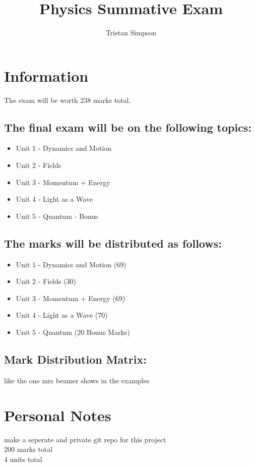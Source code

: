 \documentclass{article}
\title{Physics Summative Exam}
\author{Tristan Simpson}
\begin{document}
\maketitle
\tableofcontents
\doublespacing

\section{Information}
The exam will be worth 238 marks total.
\subsection*{The final exam will be on the following topics:}
\begin{itemize}
    \item Unit 1 - Dynamics and Motion
    \item Unit 2 - Fields
    \item Unit 3 - Momentum + Energy
    \item Unit 4 - Light as a Wave
    \item Unit 5 - Quantum - Bonus
\end{itemize}
\subsection*{The marks will be distributed as follows:}
\begin{itemize}
    \item Unit 1 - Dynamics and Motion (69)
    \item Unit 2 - Fields (30)
    \item Unit 3 - Momentum + Energy (69)
    \item Unit 4 - Light as a Wave (70)
    \item Unit 5 - Quantum (20 Bonus Marks)
\end{itemize}
\subsection*{Mark Distribution Matrix:}
like the one mrs beamer shows in the examples



\section{Personal Notes}
make a seperate and private git repo for this project \\
200 marks total \\
4 units total
\end{document}
